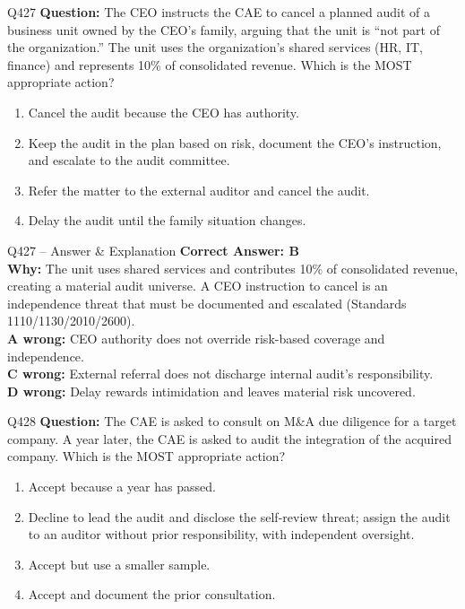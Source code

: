 \documentclass[aspectratio=169,10pt]{beamer}
\begin{document}
	\begin{frame}[t]{Q427}
		\small
		\textbf{Question:} The CEO instructs the CAE to cancel a planned audit of a business unit owned by the CEO's family, arguing that the unit is ``not part of the organization.'' The unit uses the organization's shared services (HR, IT, finance) and represents 10\% of consolidated revenue. Which is the MOST appropriate action?
		\begin{enumerate}[label=\Alph*.,itemsep=1pt,topsep=2pt]
			\item Cancel the audit because the CEO has authority.
			\item Keep the audit in the plan based on risk, document the CEO's instruction, and escalate to the audit committee.
			\item Refer the matter to the external auditor and cancel the audit.
			\item Delay the audit until the family situation changes.
		\end{enumerate}
	\end{frame}
	
	\begin{frame}[t]{Q427 -- Answer \& Explanation}
		\small
		\textbf{Correct Answer: B} \\[4pt]
		\textbf{Why:} The unit uses shared services and contributes 10\% of consolidated revenue, creating a material audit universe. A CEO instruction to cancel is an independence threat that must be documented and escalated (Standards 1110/1130/2010/2600). \\[4pt]
		\textbf{A wrong:} CEO authority does not override risk-based coverage and independence. \\[2pt]
		\textbf{C wrong:} External referral does not discharge internal audit's responsibility. \\[2pt]
		\textbf{D wrong:} Delay rewards intimidation and leaves material risk uncovered.
	\end{frame}
	
	\begin{frame}[t]{Q428}
		\small
		\textbf{Question:} The CAE is asked to consult on M\&A due diligence for a target company. A year later, the CAE is asked to audit the integration of the acquired company. Which is the MOST appropriate action?
		\begin{enumerate}[label=\Alph*.,itemsep=1pt,topsep=2pt]
			\item Accept because a year has passed.
			\item Decline to lead the audit and disclose the self-review threat; assign the audit to an auditor without prior responsibility, with independent oversight.
			\item Accept but use a smaller sample.
			\item Accept and document the prior consultation.
		\end{enumerate}
	\end{frame}
	
\end{document}
